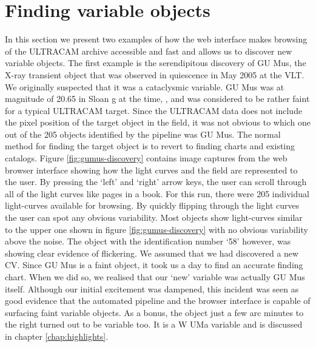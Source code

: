 \section{Finding variable objects}
In this section we present two examples of how the web interface makes browsing of the ULTRACAM archive accessible and fast and allows us to discover new variable objects. The first example is the serendipitous discovery of {GU Mus}, the X-ray transient object that was observed in quiescence in May 2005 at the VLT. We originally suspected that it was a cataclysmic variable. {GU Mus} was at magnitude of 20.65 in Sloan g at the time, \citep{tariq2010}, and was considered to be rather faint for a typical ULTRACAM target. Since the ULTRACAM data does not include the pixel position of the target object in the field, it was not obvious to which one out of the 205 objects identified by the pipeline was {GU Mus}. The normal method for finding the target object is to revert to finding charts and existing catalogs. Figure \ref{fig:gumus-discovery} contains image captures from the web browser interface showing how the light curves and the field are represented to the user. By pressing the `left' and `right' arrow keys, the user can scroll through all of the light curves like pages in a book. For this run, there were 205 individual light-curves available for browsing. By quickly flipping through the light curves the user can spot any obvious variability. Most objects show light-curves similar to the upper one shown in figure \ref{fig:gumus-discovery} with no obvious variability above the noise. The object with the identification number `58' however, was showing clear evidence of flickering. We assumed that we had discovered a new CV. Since {GU Mus} is a faint object, it took us a day to find an accurate finding chart. When we did so, we realised that our `new' variable was actually {GU Mus} itself. Although our initial excitement was dampened, this incident was seen as good evidence that the automated pipeline and the browser interface is capable of surfacing faint variable objects. As a bonus, the object just a few arc minutes to the right turned out to be variable too. It is a {W UMa} variable and is discussed in chapter \ref{chap:highlights}.

